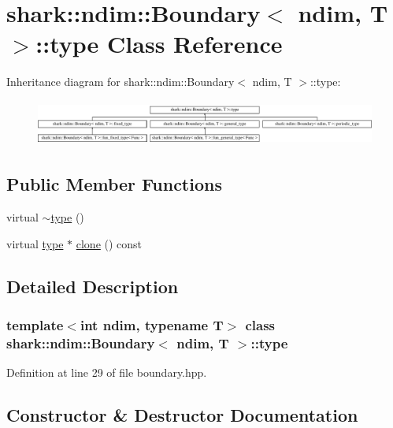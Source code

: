 \hypertarget{classshark_1_1ndim_1_1_boundary_1_1type}{}\section{shark\+:\+:ndim\+:\+:Boundary$<$ ndim, T $>$\+:\+:type Class Reference}
\label{classshark_1_1ndim_1_1_boundary_1_1type}
Inheritance diagram for shark\+:\+:ndim\+:\+:Boundary$<$ ndim, T $>$\+:\+:type\+:\begin{figure}[H]
\begin{center}
\leavevmode
\includegraphics[height=1.521739cm]{classshark_1_1ndim_1_1_boundary_1_1type}
\end{center}
\end{figure}
\subsection*{Public Member Functions}
\begin{DoxyCompactItemize}
\item 
virtual \hyperlink{classshark_1_1ndim_1_1_boundary_1_1type_a55af4628ea73154253616df9809587ad}{$\sim$type} ()
\item 
virtual \hyperlink{classshark_1_1ndim_1_1_boundary_1_1type}{type} $\ast$ \hyperlink{classshark_1_1ndim_1_1_boundary_1_1type_a5651988ce3a6c229009d3fa849e820dc}{clone} () const
\end{DoxyCompactItemize}


\subsection{Detailed Description}
\subsubsection*{template$<$int ndim, typename T$>$\newline
class shark\+::ndim\+::\+Boundary$<$ ndim, T $>$\+::type}



Definition at line 29 of file boundary.\+hpp.



\subsection{Constructor \& Destructor Documentation}
\hypertarget{classshark_1_1ndim_1_1_boundary_1_1type_a55af4628ea73154253616df9809587ad}{}\label{classshark_1_1ndim_1_1_boundary_1_1type_a55af4628ea73154253616df9809587ad} 
